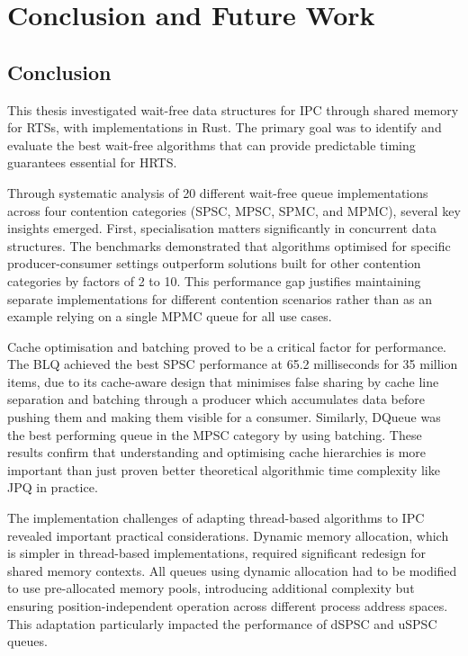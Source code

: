 \chapter{Conclusion and Future Work}\label{ch:conclusion}

\section{Conclusion}

This thesis investigated wait-free data structures for \ac{IPC} through shared memory for \acsp{RTS}, with implementations in Rust. The primary goal was to identify and evaluate the best wait-free algorithms that can provide predictable timing guarantees essential for \ac{HRTS}.

Through systematic analysis of 20 different wait-free queue implementations across four contention categories (\ac{SPSC}, \ac{MPSC}, \ac{SPMC}, and \ac{MPMC}), several key insights emerged. First, specialisation matters significantly in concurrent data structures. The benchmarks demonstrated that algorithms optimised for specific producer-consumer settings outperform solutions built for other contention categories by factors of 2 to 10. This performance gap justifies maintaining separate implementations for different contention scenarios rather than as an example relying on a single \ac{MPMC} queue for all use cases.

Cache optimisation and batching proved to be a critical factor for performance. The \acf{BLQ} achieved the best \ac{SPSC} performance at 65.2 milliseconds for 35 million items, due to its cache-aware design that minimises false sharing by cache line separation and batching through a producer which accumulates data before pushing them and making them visible for a consumer. Similarly, DQueue was the best performing queue in the \ac{MPSC} category by using batching. These results confirm that understanding and optimising cache hierarchies is more important than just proven better theoretical algorithmic time complexity like \ac{JPQ} in practice.

The implementation challenges of adapting thread-based algorithms to \ac{IPC} revealed important practical considerations. Dynamic memory allocation, which is simpler in thread-based implementations, required significant redesign for shared memory contexts. All queues using dynamic allocation had to be modified to use pre-allocated memory pools, introducing additional complexity but ensuring position-independent operation across different process address spaces. This adaptation particularly impacted the performance of \ac{dSPSC} and \ac{uSPSC} queues.

